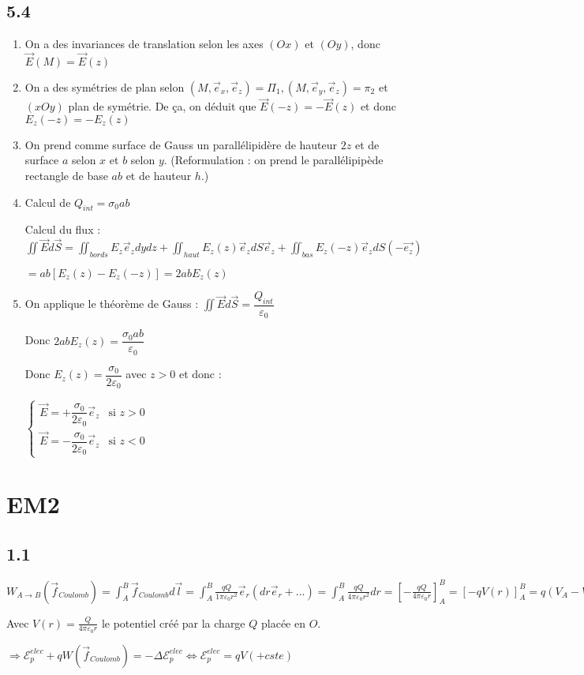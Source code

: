 \documentclass[a4paper,12pt]{book}
\begin{document}
\subsection{5.4}
\begin{enumerate}
\item On a des invariances de translation selon les axes $(Ox)$ et $(Oy)$, donc $\vec{E}(M)=\vec{E}(z)$
\item On a des symétries de plan selon $(M,\vec{e}_x,\vec{e}_z)=\Pi_1, (M,\vec{e}_y,\vec{e}_z)=\pi_2$ et $(xOy)$ plan de symétrie. De ça, on déduit que $\vec{E}(-z) = -\vec{E}(z)$ et donc $E_z(-z) = -E_z(z)$
\item On prend comme surface de Gauss un parallélipidère de hauteur $2z$ et de surface $a$ selon $x$ et $b$ selon $y$. (Reformulation : on prend le parallélipipède rectangle de base $ab$ et de hauteur $h$.)
\item Calcul de $Q_{int} = \sigma_0 ab$
\par Calcul du flux : $\iint \vec{E}d\vec{S} = \iint_{bords} E_z\vec{e}_zdydz + \iint_{haut} E_z(z)\vec{e}_zdS\vec{e}_z+ \iint_{bas} E_z(-z)\vec{e}_zdS(-\vec{e_z})$
\par $ = ab\left[E_z(z) - E_z(-z)\right] = 2abE_z(z)$
\item On applique le théorème de Gauss : $\iint \vec{E}d\vec{S} = \dfrac{Q_{int}}{\varepsilon_0}$
\par Donc $2abE_z(z) = \dfrac{\sigma_0ab}{\varepsilon_0}$
\par Donc $E_z(z) = \dfrac{\sigma_0}{2\varepsilon_0}$ avec $z>0$ et donc :
\par $\left\{\begin{array}{rl} \vec{E} = +\dfrac{\sigma_0}{2\varepsilon_0}\vec{e}_z & \text{si $z>0$} \\ \vec{E} = -\dfrac{\sigma_0}{2\varepsilon_0}\vec{e}_z & \text{si $z<0$} \end{array}\right.$
\end{enumerate}

\section{EM2}
\subsection{1.1}
$W_{A\to B}(\vec{f}_{Coulomb})=\int_A^B\vec{f}_{Coulomb}d\vec{l}=\int_A^B\frac{qQ}{1\pi\varepsilon_0r^2}\vec{e}_r(dr\vec{e}_r +...) = \int_A^B\frac{qQ}{4\pi\varepsilon_0r^2}dr= \left[-\frac{qQ}{4\pi\varepsilon_0r}\right]_A^B = [-qV(r)]_A^B = q(V_A-V_B)$
\par Avec $V(r)=\frac{Q}{4\pi\varepsilon_0r}$ le potentiel créé par la charge $Q$ placée en $O$.
\par $\Rightarrow \mathcal{E}_p^{elec} + qW(\vec{f}_{Coulomb}) = -\Delta\mathcal{E}_p^{elec} \Leftrightarrow \mathcal{E}_p^{elec}=qV (+cste)$
\end{document}
